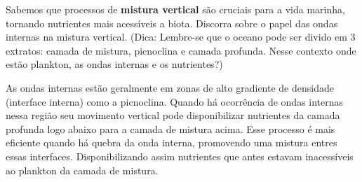\documentclass[letterpaper,portuguese,12pt,pdftex]{exam}
\begin{document}
\begin{questions}

\question[2]
Sabemos que processos de {\bf mistura vertical} são cruciais para a vida
marinha, tornando nutrientes mais acessíveis a biota.  Discorra sobre o papel
das ondas internas na mistura vertical.  (Dica: Lembre-se que o oceano pode ser
divido em 3 extratos: camada de mistura, picnoclina e camada profunda.  Nesse
contexto onde estão plankton, as ondas internas e os nutrientes?)

\begin{solution}
  As ondas internas estão geralmente em zonas de alto gradiente de densidade
  (interface interna) como a picnoclina.  Quando há ocorrência de ondas internas
  nessa região seu movimento vertical pode disponibilizar nutrientes da camada
  profunda logo abaixo para a camada de mistura acima.  Esse processo é mais
  eficiente  quando há quebra da onda interna, promovendo uma mistura entres
  essas interfaces.  Disponibilizando assim nutrientes que antes estavam
  inacessíveis ao plankton da camada de mistura.
\end{solution}


\end{questions}
\end{document}
